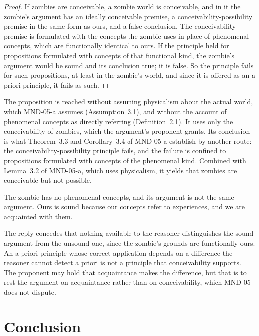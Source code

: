 \documentclass{situationist-preprint}
\begin{document}
\begin{proof}
If zombies are conceivable, a zombie world is conceivable, and in it the zombie's argument has an ideally conceivable premise, a conceivability-possibility premise in the same form as ours, and a false conclusion. The conceivability premise is formulated with the concepts the zombie uses in place of phenomenal concepts, which are functionally identical to ours. If the principle held for propositions formulated with concepts of that functional kind, the zombie's argument would be sound and its conclusion true; it is false. So the principle fails for such propositions, at least in the zombie's world, and since it is offered as an a priori principle, it fails as such.
\end{proof}

The proposition is reached without assuming physicalism about the actual world, which MND-05-a assumes (Assumption~3.1), and without the account of phenomenal concepts as directly referring (Definition~2.1). It uses only the conceivability of zombies, which the argument's proponent grants. Its conclusion is what Theorem~3.3 and Corollary~3.4 of MND-05-a establish by another route: the conceivability-possibility principle fails, and the failure is confined to propositions formulated with concepts of the phenomenal kind. Combined with Lemma~3.2 of MND-05-a, which uses physicalism, it yields that zombies are conceivable but not possible.

\begin{objection}
The zombie has no phenomenal concepts, and its argument is not the same argument. Ours is sound because our concepts refer to experiences, and we are acquainted with them.
\end{objection}

\begin{reply}
The reply concedes that nothing available to the reasoner distinguishes the sound argument from the unsound one, since the zombie's grounds are functionally ours. An a priori principle whose correct application depends on a difference the reasoner cannot detect a priori is not a principle that conceivability supports. The proponent may hold that acquaintance makes the difference, but that is to rest the argument on acquaintance rather than on conceivability, which MND-05 does not dispute.
\end{reply}

\section{Conclusion}
\end{document}
